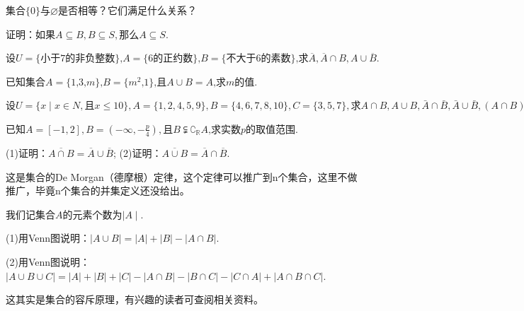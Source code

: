 \documentclass[lang=cn,math=cm,chinesefont=nofont,11pt,scheme=chinese,onecol]{elegantbook}
\begin{document}
\begin{exercise}\label{exer:11}
  集合$\{0\}$与$\varnothing$是否相等？它们满足什么关系？
\end{exercise}

\begin{exercise}\label{exer:12}
  证明：$\text{如果}A\subseteq B,B\subseteq S,\text{那么}A\subseteq S$.
\end{exercise}

\begin{exercise}\label{exer:20}
  $\text{设}U=\{\text{小于7的非负整数}\}\text{,}A=\{6\text{的正约数}\}\text{,}B=\{\text{不大于6的素数}\}\text{,}\text{求}\overline{A},\overline{A}\cap B, A\cup\overline{B}.$
\end{exercise}

\begin{exercise}\label{exer:13}
  $\text{已知集合}A=\{1\text{,3,}m\}\text{,}B=\{m^2\text{,1}\}\text{,且}A\cup B=A\text{,求}m\text{的值}.$
\end{exercise}

\begin{exercise}\label{exer:19}
  $\text{设}U=\{x\mid x{\in}N,\text{且}x{\leqslant}10\},A=\{1,2,4,5,9\},B{=}\{4,6,7,8,10\},C=\{3,5,7\},\text{求}A\cap B,A\cup B,\bar{A}\cap\bar{B},\bar{A}\cup\bar{B},(A\cap B)\cap C,(A\cup B)\cup C.$
\end{exercise}

\begin{exercise}\label{exer:14}
  $\text{已知}A=[-1,2],B=\left(-\infty,-\frac{p}{4}\right),\text{且}B\subsetneqq{\complement}_{\mathbb{R}}A\text{,求实数}p\text{的取值范围}.$
\end{exercise}

\begin{exercise}\label{exer:15}
  (1)证明：$\overline{A\cap B}=\overline{A}\cup\overline{B}$;
  (2)证明：$\overline{A\cup B}=\overline{A}\cap\overline{B}.$

  这是集合的De Morgan（德摩根）定律，这个定律可以推广到n个集合，这里不做推广，毕竟n个集合的并集定义还没给出。
\end{exercise}

\begin{exercise}\label{exer:16}
  我们记集合$A$的元素个数为$\mid A\mid$.

  (1)用Venn图说明：$|A\cup B|=|A|+|B|-|A\cap B|$.

  (2)用Venn图说明：$|A\cup B\cup C|=|A|+|B|+|C|-|A\cap B|-|B\cap C|-|C\cap A|+|A\cap B\cap C|$.

  这其实是集合的容斥原理，有兴趣的读者可查阅相关资料。
\end{exercise}
\end{document}

